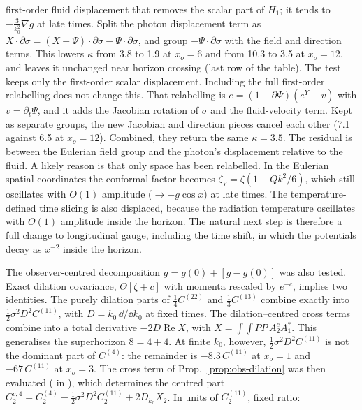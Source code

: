 \begin{enumerate}
  first-order fluid displacement that removes the scalar part of $H_1$; it tends to
  $-\frac3{k_0^2}\nabla g$ at late times. Split the photon displacement term as
  $X\cdot\partial\sigma=(X+\Psi)\cdot\partial\sigma-\Psi\cdot\partial\sigma$, and group
  $-\Psi\cdot\partial\sigma$ with the field and direction terms. This lowers $\kappa$ from
  3.8 to 1.9 at $x_o=6$ and from 10.3 to 3.5 at $x_o=12$, and leaves it unchanged near horizon
  crossing (last row of the table). The test keeps only the first-order scalar displacement.
  Including the full first-order relabelling does not change this. That relabelling is
  $e=(1-\partial\Psi)(e^Y-v)$ with $v=\partial_t\Psi$, and it adds the Jacobian rotation of
  $\sigma$ and the fluid-velocity term. Kept as separate groups, the new Jacobian and
  direction pieces cancel each other (7.1 against 6.5 at $x_o=12$). Combined, they return the
  same $\kappa=3.5$. The residual is between the Eulerian field group and the photon's
  displacement relative to the fluid. A likely reason is that only space has been relabelled.
  In the Eulerian spatial coordinates the conformal factor becomes $\zeta_Y=\zeta(1-Qk^2/6)$,
  which still oscillates with $O(1)$ amplitude ($\to-g\cos x$) at late times. The
  temperature-defined time slicing is also displaced, because the radiation temperature
  oscillates with $O(1)$ amplitude inside the horizon. The natural next step is therefore a
  full change to longitudinal gauge, including the time shift, in which the potentials decay
  as $x^{-2}$ inside the horizon.
\end{enumerate}
The observer-centred decomposition $g=g(0)+[g-g(0)]$ was also tested. Exact dilation
covariance, $\Theta[\zeta+c]$ with momenta rescaled by $e^{-c}$, implies two identities. The
purely dilation parts of $\frac14C^{(22)}$ and $\frac13C^{(13)}$ combine exactly into
$\frac12\sigma^2D^2C^{(11)}$, with $D=k_0\,\dd/\dd k_0$ at fixed times. The dilation--centred
cross terms combine into a total derivative $-2D\operatorname{Re}X$, with
$X=\int\!\!\int PP\,A^c_2A_1^*$. This generalises the superhorizon $8=4+4$. At finite $k_0$,
however, $\frac12\sigma^2D^2C^{(11)}$ is not the dominant part of $C^{(4)}$: the remainder is
$-8.3\,C^{(11)}$ at $x_o=1$ and $-67\,C^{(11)}$ at $x_o=3$. The cross term of
Prop.~\ref{prop:obs-dilation} was then evaluated ( in ), which
determines the centred part $C^{c,4}_2=C^{(4)}_2-\frac12\sigma^2D^2C^{(11)}_2+2D_{k_0}X_2$. In units of
$C^{(11)}_2$, fixed ratio:
